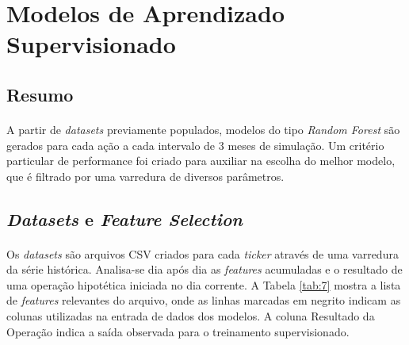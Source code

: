 \FloatBarrier
\section{Modelos de Aprendizado Supervisionado}



\FloatBarrier
\subsection{Resumo}

\paragraph{} A partir de \textit{datasets} previamente populados, modelos do tipo \textit{Random Forest} são gerados para cada ação a cada intervalo de 3 meses de simulação. Um critério particular de performance foi criado para auxiliar na escolha do melhor modelo, que é filtrado por uma varredura de diversos parâmetros.



\FloatBarrier
\subsection{\textit{Datasets} e \textit{Feature Selection}}
\label{sub:dataset_gen}

\paragraph{} Os \textit{datasets} são arquivos CSV criados para cada \textit{ticker} através de uma varredura da série histórica. Analisa-se dia após dia as \textit{features} acumuladas e o resultado de uma operação hipotética iniciada no dia corrente. A Tabela \ref{tab:7} mostra a lista de \textit{features} relevantes do arquivo, onde as linhas marcadas em negrito indicam as colunas utilizadas na entrada de dados dos modelos. A coluna Resultado da Operação indica a saída observada para o treinamento supervisionado.

